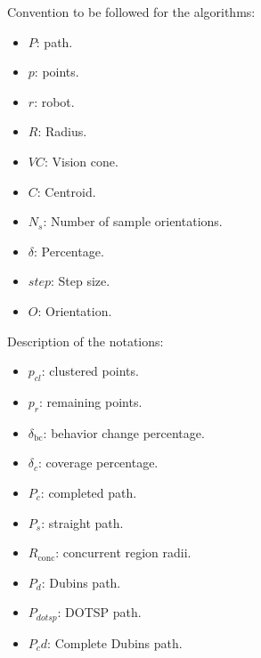 Convention to be followed for the algorithms:
\begin{multicols}{2}
\begin{itemize}[noitemsep,topsep=0pt]
    \item $P$: path.
    \item $p$: points.
    \item $r$: robot.
    \item $R$: Radius.
    \item $VC$: Vision cone.
    \item $C$: Centroid.
    \item $N_s$: Number of sample orientations.
    \item $ \delta$: Percentage.
    \item $step$: Step size.
    \item $O$: Orientation.
\end{itemize}
\end{multicols}

\vspace*{6mm}  

Description of the notations:

\begin{multicols}{2}
\begin{itemize}[noitemsep,topsep=0pt]
    \item $p_{cl}$: clustered points.
    \item $p_r$: remaining points.
    \item $\delta_{\text{bc}}$: behavior change percentage.
    \item $\delta_c$: coverage percentage.
    \item $P_c$: completed path.
    \item $P_s$: straight path.
    \item $R_{\text{conc}}$: concurrent region radii.
    \item $P_d$: Dubins path.
    \item $P_{dotsp}$: DOTSP path.
    \item $P_cd$: Complete Dubins path.
\end{itemize}
\end{multicols}

